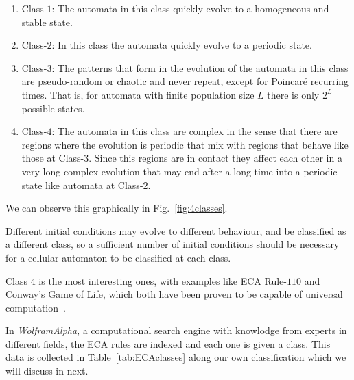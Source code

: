 \begin{enumerate}
    \item Class-$1$: The automata in this class quickly evolve to a homogeneous and stable state.
    \item Class-$2$: In this class the automata quickly evolve to a periodic state.
    \item Class-$3$: The patterns that form in the evolution of the automata in this class are pseudo-random or chaotic and never repeat, except for Poincaré recurring times. That is, for automata with finite population size $L$ there is only $2^L$ possible states.
    \item Class-$4$: The automata in this class are complex in the sense that there are regions where the evolution is periodic that mix with regions that behave like those at Class-$3$. Since this regions are in contact they affect each other in a very long complex evolution that may end after a long time into a periodic state like automata at Class-$2$. 
\end{enumerate}




We can observe this graphically in Fig.~\ref{fig:4classes}.

Different initial conditions may evolve to different behaviour, and be classified as a different class, so a sufficient number of initial conditions should be necessary for a cellular automaton to be classified at each class.

Class 4 is the most interesting ones, with examples like ECA Rule-$110$ and Conway's Game of Life, which both have been proven to be capable of universal computation~\cite{UniversalComputingECA110}. 


In \textit{WolframAlpha}, a computational search engine with knowlodge from experts in different fields, the ECA rules are indexed and each one is given a class. This data is collected in Table~\ref{tab:ECAclasses} along our own classification which we will discuss in next.














